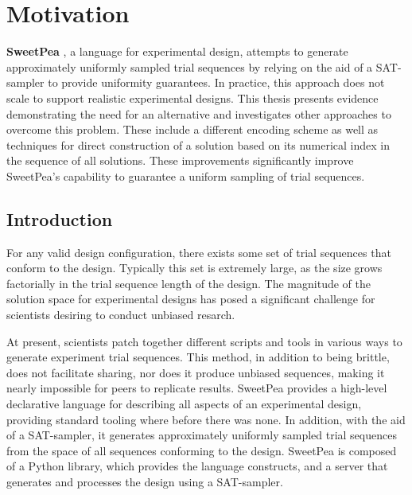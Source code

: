 
\chapter{Motivation}


\textbf{SweetPea} \cite{annie}, a language for experimental design, attempts to generate approximately uniformly sampled trial sequences by relying on the aid of a SAT-sampler to provide uniformity guarantees. In practice, this approach does not scale to support realistic experimental designs. This thesis presents evidence demonstrating the need for an alternative and investigates other approaches to overcome this problem. These include a different encoding scheme as well as techniques for direct construction of a solution based on its numerical index in the sequence of all solutions. These improvements significantly improve SweetPea's capability to guarantee a uniform sampling of trial sequences.

\section{Introduction}

For any valid design configuration, there exists some set of trial sequences that conform to the design. Typically this set is extremely large, as the size grows factorially in the trial sequence length of the design. The magnitude of the solution space for experimental designs has posed a significant challenge for scientists desiring to conduct unbiased resarch.

At present, scientists patch together different scripts and tools in various ways to generate experiment trial sequences. This method, in addition to being brittle, does not facilitate sharing, nor does it produce unbiased sequences, making it nearly impossible for peers to replicate results. SweetPea provides a high-level declarative language for describing all aspects of an experimental design, providing standard tooling where before there was none. In addition, with the aid of a SAT-sampler, it generates approximately uniformly sampled trial sequences from the space of all sequences conforming to the design. SweetPea is composed of a Python library, which provides the language constructs, and a server that generates and processes the design using a SAT-sampler.

